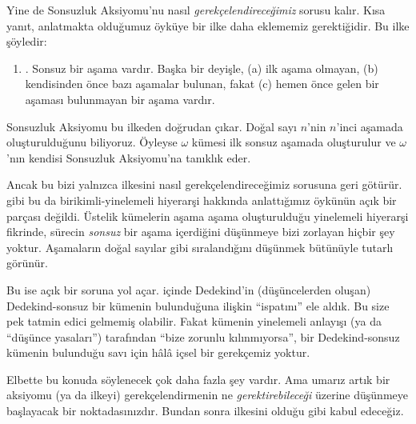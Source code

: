 Yine de Sonsuzluk Aksiyomu'nu nasıl \emph{gerekçelendireceğimiz} sorusu
kalır. Kısa yanıt, anlatmakta olduğumuz öyküye bir ilke daha eklememiz
gerektiğidir. Bu ilke şöyledir:
\begin{enumerate}
	\item[] \stagesinf. Sonsuz bir aşama vardır. Başka bir deyişle,
	(a) ilk aşama olmayan, (b) kendisinden önce bazı aşamalar bulunan, fakat
	(c) hemen önce gelen bir aşaması bulunmayan bir aşama vardır.
\end{enumerate}
Sonsuzluk Aksiyomu bu ilkeden doğrudan çıkar. Doğal sayı $n$'nin $n$'inci
aşamada oluşturulduğunu biliyoruz. Öyleyse $\omega$ kümesi ilk sonsuz
aşamada oluşturulur ve $\omega$'nın kendisi Sonsuzluk Aksiyomu'na tanıklık
eder.

Ancak bu bizi yalnızca \stagesinf{} ilkesini nasıl gerekçelendireceğimiz
sorusuna geri götürür. \stagessucc{} gibi bu da birikimli-yinelemeli
hiyerarşi hakkında anlattığımız öykünün açık bir parçası değildi. Üstelik
kümelerin aşama aşama oluşturulduğu yinelemeli hiyerarşi fikrinde, sürecin
\emph{sonsuz} bir aşama içerdiğini düşünmeye bizi zorlayan hiçbir şey
yoktur. Aşamaların doğal sayılar gibi sıralandığını düşünmek bütünüyle
tutarlı görünür.

Bu ise açık bir soruna yol açar. 
içinde Dedekind'in (düşüncelerden oluşan) Dedekind-sonsuz bir kümenin
bulunduğuna ilişkin ``ispatını'' ele aldık. Bu size pek tatmin edici
gelmemiş olabilir. Fakat \stagesinf{} kümenin yinelemeli anlayışı (ya da
``düşünce yasaları'') tarafından ``bize zorunlu kılınmıyorsa'', bir
Dedekind-sonsuz kümenin bulunduğu savı için hâlâ içsel bir gerekçemiz yoktur.

Elbette bu konuda söylenecek çok daha fazla şey vardır. Ama umarız artık
bir aksiyomu (ya da ilkeyi) gerekçelendirmenin ne \emph{gerektirebileceği}
üzerine düşünmeye başlayacak bir noktadasınızdır. Bundan sonra
\stagesinf{} ilkesini olduğu gibi kabul edeceğiz.

